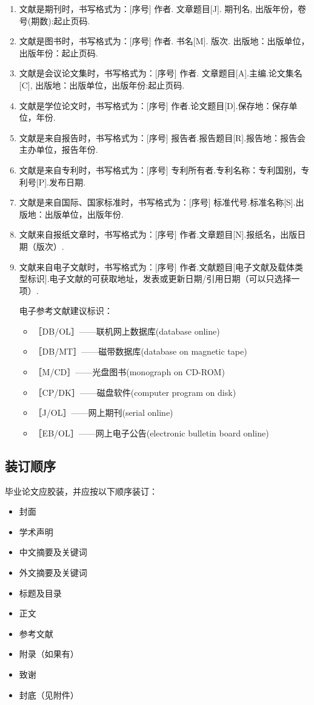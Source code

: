 \begin{enumerate}
    \item 文献是期刊时，书写格式为：[序号] 作者. 文章题目[J]. 期刊名, 出版年份，卷号(期数):起止页码.
    \item 文献是图书时，书写格式为：[序号] 作者. 书名[M]. 版次. 出版地：出版单位，出版年份：起止页码.
    \item 文献是会议论文集时，书写格式为：[序号] 作者. 文章题目[A].主编.论文集名[C], 出版地：出版单位，出版年份:起止页码.
    \item 文献是学位论文时，书写格式为：[序号] 作者.论文题目[D].保存地：保存单位，年份.
    \item 文献是来自报告时，书写格式为：[序号] 报告者.报告题目[R].报告地：报告会主办单位，报告年份.
    \item 文献是来自专利时，书写格式为：[序号] 专利所有者.专利名称：专利国别，专利号[P].发布日期.
    \item 文献是来自国际、国家标准时，书写格式为：[序号] 标准代号.标准名称[S].出版地：出版单位，出版年份.
    \item 文献来自报纸文章时，书写格式为：[序号] 作者.文章题目[N].报纸名，出版日期（版次）.
    \item 文献来自电子文献时，书写格式为：[序号] 作者.文献题目[电子文献及载体类型标识].电子文献的可获取地址，发表或更新日期/引用日期（可以只选择一项）.
    
    电子参考文献建议标识：
    \begin{itemize}
        \item ［DB/OL］——联机网上数据库(database online)
        \item ［DB/MT］——磁带数据库(database on magnetic tape)
        \item ［M/CD］——光盘图书(monograph on CD-ROM)
        \item ［CP/DK］——磁盘软件(computer program on disk)
        \item ［J/OL］——网上期刊(serial online)
        \item ［EB/OL］——网上电子公告(electronic bulletin board online)
    \end{itemize}
\end{enumerate}



\subsection{装订顺序}
毕业论文应胶装，并应按以下顺序装订：

\begin{itemize}
    \item 封面
    \item 学术声明
    \item 中文摘要及关键词
    \item 外文摘要及关键词
    \item 标题及目录
    \item 正文
    \item 参考文献
    \item 附录（如果有）
    \item 致谢
    \item 封底（见附件）
\end{itemize}
